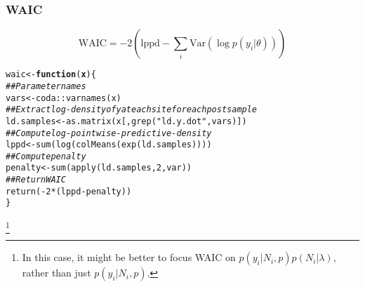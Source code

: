 \documentclass[color=usenames,dvipsnames]{beamer}\usepackage[]{graphicx}\usepackage[]{color}
\makeatletter
\newcommand{\hlnum}[1]{\textcolor[rgb]{0.69,0.494,0}{#1}}%
\newcommand{\hlstr}[1]{\textcolor[rgb]{0.749,0.012,0.012}{#1}}%
\newcommand{\hlcom}[1]{\textcolor[rgb]{0.514,0.506,0.514}{\textit{#1}}}%
\newcommand{\hlopt}[1]{\textcolor[rgb]{0,0,0}{#1}}%
\newcommand{\hlstd}[1]{\textcolor[rgb]{0,0,0}{#1}}%
\newcommand{\hlkwa}[1]{\textcolor[rgb]{0,0,0}{\textbf{#1}}}%
\newcommand{\hlkwb}[1]{\textcolor[rgb]{0,0.341,0.682}{#1}}%
\newcommand{\hlkwc}[1]{\textcolor[rgb]{0,0,0}{\textbf{#1}}}%
\newcommand{\hlkwd}[1]{\textcolor[rgb]{0.004,0.004,0.506}{#1}}%
\newenvironment{kframe}{%
 \def\at@end@of@kframe{}%
 \ifinner\ifhmode%
  \def\at@end@of@kframe{\end{minipage}}%
  \begin{minipage}{\columnwidth}%
 \fi\fi%
 \def\FrameCommand##1{\hskip\@totalleftmargin \hskip-\fboxsep
 \colorbox{shadecolor}{##1}\hskip-\fboxsep
     \hskip-\linewidth \hskip-\@totalleftmargin \hskip\columnwidth}%
 \MakeFramed {\advance\hsize-\width
   \@totalleftmargin\z@ \linewidth\hsize
   \@setminipage}}%
 {\par\unskip\endMakeFramed%
 \at@end@of@kframe}
\newenvironment{knitrout}{}{} %
\makeatother
\begin{document}
\bgroup
\let\oldfootnoterule\footnoterule
\def\footnoterule{\only<2->\oldfootnoterule}
\begin{frame}[fragile]
  \frametitle{WAIC}
  \[
    \mathrm{WAIC} = -2(\mathrm{lppd} - \sum_i \mathrm{Var}(\log p(y_i|\theta)))
  \]

\begin{knitrout}\footnotesize
{}\color{fgcolor}\begin{kframe}
\begin{alltt}
\hlstd{waic} \hlkwb{<-} \hlkwa{function}\hlstd{(}\hlkwc{x}\hlstd{) \{}
    \hlcom{## Parameter names}
    \hlstd{vars} \hlkwb{<-} \hlstd{coda}\hlopt{::}\hlkwd{varnames}\hlstd{(x)}
    \hlcom{## Extract log-density of y at each site for each post sample}
    \hlstd{ld.samples} \hlkwb{<-} \hlkwd{as.matrix}\hlstd{(x[,}\hlkwd{grep}\hlstd{(}\hlstr{"ld.y.dot"}\hlstd{, vars)])}
    \hlcom{## Compute log-pointwise-predictive-density}
    \hlstd{lppd} \hlkwb{<-} \hlkwd{sum}\hlstd{(}\hlkwd{log}\hlstd{(}\hlkwd{colMeans}\hlstd{(}\hlkwd{exp}\hlstd{(ld.samples))))}
    \hlcom{## Compute penalty}
    \hlstd{penalty} \hlkwb{<-} \hlkwd{sum}\hlstd{(}\hlkwd{apply}\hlstd{(ld.samples,} \hlnum{2}\hlstd{, var))}
    \hlcom{## Return WAIC}
    \hlkwd{return}\hlstd{(}\hlopt{-}\hlnum{2}\hlopt{*}\hlstd{(lppd}\hlopt{-}\hlstd{penalty))}
\hlstd{\}}
\end{alltt}
\end{kframe}
\end{knitrout}
\let\thefootnote\relax\footnote<2->{In this case, it might be better to focus WAIC on
$p(y_i|N_i,p)p(N_i|\lambda)$, rather than just $p(y_i|N_i,p)$.} 
\end{frame}
\egroup


\end{document}
